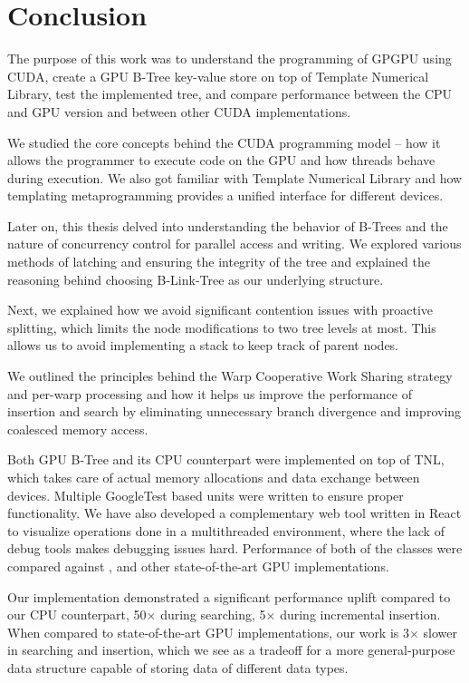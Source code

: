 \chapter{Conclusion}

The purpose of this work was to understand the programming of GPGPU using CUDA, create a GPU B-Tree key-value store on top of Template Numerical Library, test the implemented tree, and compare performance between the CPU and GPU version and between other CUDA implementations.

We studied the core concepts behind the CUDA programming model -- how it allows the programmer to execute code on the GPU and how threads behave during execution. We also got familiar with Template Numerical Library and how templating metaprogramming provides a unified interface for different devices.

Later on, this thesis delved into understanding the behavior of B-Trees and the nature of concurrency control for parallel access and writing. We explored various methods of latching and ensuring the integrity of the tree and explained the reasoning behind choosing B-Link-Tree as our underlying structure.

Next, we explained how we avoid significant contention issues with proactive splitting, which limits the node modifications to two tree levels at most. This allows us to avoid implementing a stack to keep track of parent nodes.

We outlined the principles behind the Warp Cooperative Work Sharing strategy and per-warp processing and how it helps us improve the performance of insertion and search by eliminating unnecessary branch divergence and improving coalesced memory access.

Both GPU B-Tree and its CPU counterpart were implemented on top of TNL, which takes care of actual memory allocations and data exchange between devices. Multiple GoogleTest based units were written to ensure proper functionality. We have also developed a complementary web tool written in React to visualize operations done in a multithreaded environment, where the lack of debug tools makes debugging issues hard. Performance of both of the classes were compared against ,  and other state-of-the-art GPU implementations.

Our implementation demonstrated a significant performance uplift compared to our CPU counterpart, 50$\times$ during searching, 5$\times$ during incremental insertion. When compared to state-of-the-art GPU implementations, our work is 3$\times$ slower in searching and insertion, which we see as a tradeoff for a more general-purpose data structure capable of storing data of different data types.

